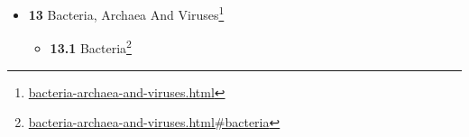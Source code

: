 \documentclass[
]{article}
\providecommand{\tightlist}{%
  \setlength{\itemsep}{0pt}\setlength{\parskip}{0pt}}
\providecommand{\tightlist}{%
  \setlength{\itemsep}{0pt}\setlength{\parskip}{0pt}}
\let\rmarkdownfootnote\footnote%
\def\footnote{\protect\rmarkdownfootnote}
\renewcommand{\href}[2]{#2\footnote{\url{#1}}}
\theoremstyle{definition}
\theoremstyle{definition}
\theoremstyle{definition}
\theoremstyle{remark}
\begin{document}
\begin{itemize}
\begin{itemize}
    \begin{itemize}
    \tightlist
    \item
      \href{regulation-of-gene-expression.html\#three-prime-untranslated-regions-and-micrornas}{\emph{}\textbf{12.4.1}
      Three prime untranslated regions and microRNAs}
    \end{itemize}
  \item
    \href{regulation-of-gene-expression.html\#regulation-of-translation}{\emph{}\textbf{12.5}
    Regulation of translation}
  \end{itemize}
\item
  \href{bacteria-archaea-and-viruses.html}{\emph{}\textbf{13} Bacteria,
  Archaea And Viruses}

  \begin{itemize}
  \tightlist
  \item
    \href{bacteria-archaea-and-viruses.html\#bacteria}{\emph{}\textbf{13.1}
    Bacteria}


\end{itemize}
\end{itemize}
\end{document}
